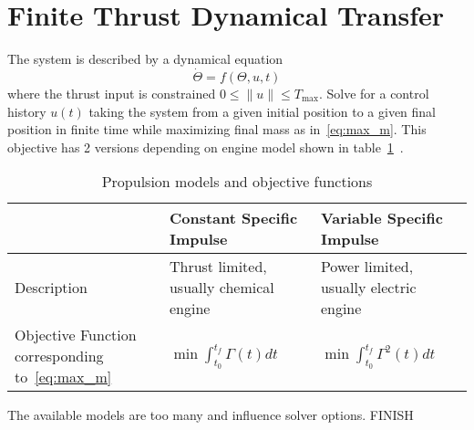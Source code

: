 \section{Finite Thrust Dynamical Transfer}

The system is described by a dynamical equation
\begin{equation}
    \dot \Theta = f(\Theta, u, t)
\end{equation}
where the thrust input is constrained \(0 \leq \lVert u \rVert \leq T_{\max}\). Solve for a control history \(u(t)\) taking the system from a given initial position to a given final position in finite time while maximizing final mass as in~\eqref{eq:max_m}. This objective has 2 versions depending on engine model shown in table~\ref{tab:prop_models}~\cite{Conway_2010}.

\begin{table}[]
    \centering
    \begin{tabular}{p{5cm}p{5cm}p{5cm}} \toprule
        & \textbf{Constant Specific Impulse} & \textbf{Variable Specific Impulse} \\ \midrule
        Description & Thrust limited, usually chemical engine & Power limited, usually electric engine \\
        Objective Function corresponding to~\eqref{eq:max_m} & \(\min \int_{t_0}^{t_f} \Gamma(t) dt\) & \(\min \int_{t_0}^{t_f} \Gamma^2(t) dt\) \\ \bottomrule
    \end{tabular}
    \caption{Propulsion models and objective functions}
    \label{tab:prop_models}
\end{table}

The available models are too many and influence solver options. FINISH